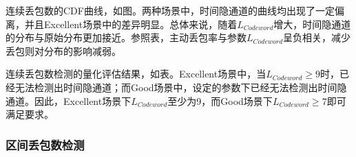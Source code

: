 连续丢包数的CDF曲线，如图。两种场景中，时间隐通道的曲线均出现了一定偏离，并且Excellent场景中的差异明显。总体来说，随着$L_{Codeword}$增大，时间隐通道的分布与原始分布更加接近。参照表，主动丢包率与参数$L_{Codeword}$呈负相关，减少丢包则对分布的影响减弱。

连续丢包数检测的量化评估结果，如表。Excellent场景中，当$L_{Codeword}\ge 9$时，已经无法检测出时间隐通道；而Good场景中，设定的参数下已经无法检测出时间隐通道。因此，Excellent场景下$L_{Codeword}$至少为9，而Good场景下$L_{Codeword}\ge 7$即可满足要求。

\subsubsection{区间丢包数检测}
\label{chap:zigzag:results:undetectability:win}

